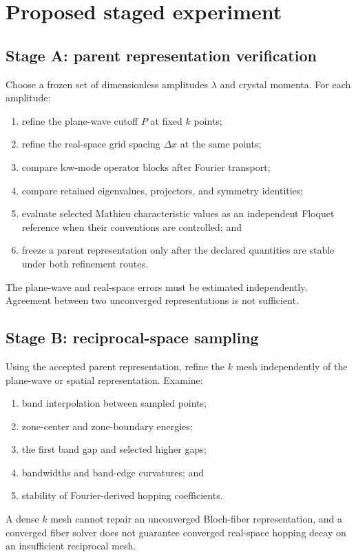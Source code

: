 \section*{Proposed staged experiment}

\subsection*{Stage A: parent representation verification}

Choose a frozen set of dimensionless amplitudes $\lambda$ and crystal momenta.
For each amplitude:
\begin{enumerate}
    \item refine the plane-wave cutoff $P$ at fixed $k$ points;
    \item refine the real-space grid spacing $\Delta x$ at the same points;
    \item compare low-mode operator blocks after Fourier transport;
    \item compare retained eigenvalues, projectors, and symmetry identities;
    \item evaluate selected Mathieu characteristic values as an independent
          Floquet reference when their conventions are controlled; and
    \item freeze a parent representation only after the declared quantities
          are stable under both refinement routes.
\end{enumerate}

The plane-wave and real-space errors must be estimated independently. Agreement
between two unconverged representations is not sufficient.

\subsection*{Stage B: reciprocal-space sampling}

Using the accepted parent representation, refine the $k$ mesh independently of
the plane-wave or spatial representation. Examine:
\begin{enumerate}
    \item band interpolation between sampled points;
    \item zone-center and zone-boundary energies;
    \item the first band gap and selected higher gaps;
    \item bandwidths and band-edge curvatures; and
    \item stability of Fourier-derived hopping coefficients.
\end{enumerate}
A dense $k$ mesh cannot repair an unconverged Bloch-fiber representation, and a
converged fiber solver does not guarantee converged real-space hopping decay on
an insufficient reciprocal mesh.

